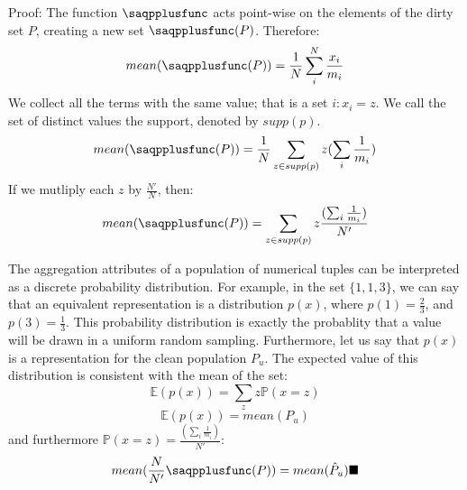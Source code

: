 Proof: The function $\saqpplusfunc$ acts point-wise on the elements of the dirty set $P$, creating a new set $\saqpplusfunc(P)$.
Therefore:
\[
mean(\saqpplusfunc(P)) = \frac{1}{N}\sum_i^N \frac{x_i}{m_i}
\]
We collect all the terms with the same value; that is a set ${i:x_i=z}$.
We call the set of distinct values the support, denoted by $supp(p)$.
\[
mean(\saqpplusfunc(P)) = \frac{1}{N}\sum_{z \in supp(p)} z(\sum_i \frac{1}{m_i})
\]
If we mutliply each $z$ by $\frac{N'}{N}$, then:
\[
mean(\saqpplusfunc(P)) = \sum_{z \in supp(p)} z\frac{(\sum_i \frac{1}{m_i})}{N'}
\]

The aggregation attributes of a population of numerical tuples can be interpreted as a discrete probability distribution.
For example, in the set $\{1, 1, 3\}$, we can say that an equivalent representation is a distribution $p(x)$, where $p(1)=\frac{2}{3}$,
and $p(3)=\frac{1}{3}$.
This probability distribution is exactly the probablity that a value will be drawn in a uniform random sampling.
Furthermore, let us say that $p(x)$ is a representation for the clean population $P_{u}$.
The expected value of this distribution is consistent with the mean of the set:
\[
\mathbb{E}(p(x)) = \sum_z z \mathbb{P}(x=z)
\]
\[
\mathbb{E}(p(x)) = mean(P_{u})
\]
and furthermore $\mathbb{P}(x=z)=\frac{(\sum_i \frac{1}{m_i})}{N'}$:
\[
mean(\frac{N}{N'}\saqpplusfunc(P))= mean(\hat{P}_{u})\blacksquare
\]

